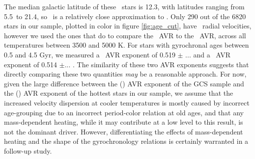The median galactic latitude of these \kepler\ stars is 12.3\degrees, with
latitudes ranging from 5.5\degrees\ to 21.4\degrees, so \vb\ is a relatively
close approximation to \vz.
Only 290 out of the 6820 stars in our sample, plotted in color in figure
\ref{fig:age_cut}, have \gaia\ radial velocities, however we used the ones
that do to compare the \vz\ AVR to the \vb\ AVR, across all temperatures
between 3500 and 5000 K.
For stars with gyrochronal ages between 0.5 and 4.5 Gyr, we measured a \vz\
AVR exponent of 0.519 $\pm$ ... and a \vb\ AVR exponent of 0.514 $\pm$... .
The similarity of these two AVR exponents suggests that directly comparing
these two quantities {\it may} be a reasonable approach.
For now, given the large difference between the (\vz) AVR exponent of the GCS
sample and the (\vb) AVR exponent of the hottest stars in our sample, we
assume that the increased velocity dispersion at cooler temperatures is mostly
caused by incorrect age-grouping due to an incorrect period-color relation at
old ages, and that any mass-dependent heating, while it may contribute at a
low level to this result, is not the dominant driver.
However, differentiating the effects of mass-dependent heating and the shape
of the gyrochronology relations is certainly warranted in a follow-up study.

